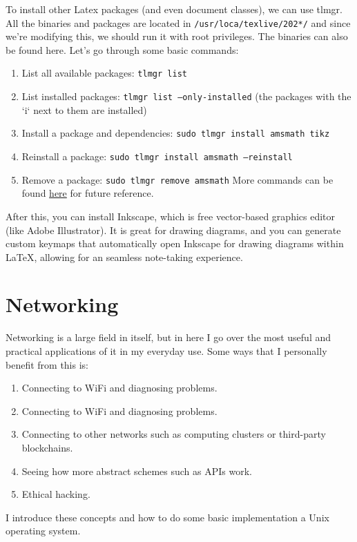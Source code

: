 \documentclass{article}
\begin{document}
To install other Latex packages (and even document classes), we can use tlmgr. All the binaries and packages are located in \texttt{/usr/loca/texlive/202*/} and since we're modifying this, we should run it with root privileges. The binaries can also be found here. Let's go through some basic commands: 
\begin{enumerate}
  \item List all available packages: \texttt{tlmgr list}
  \item List installed packages: \texttt{tlmgr list --only-installed} (the packages with the `i` next to them are installed)
  \item Install a package and dependencies: \texttt{sudo tlmgr install amsmath tikz} 
  \item Reinstall a package: \texttt{sudo tlmgr install amsmath --reinstall}
  \item Remove a package: \texttt{sudo tlmgr remove amsmath} 
More commands can be found \href{http://tug.ctan.org/info/tlmgrbasics/doc/tlmgr.pdf}{here} for future reference.  
\end{enumerate}

After this, you can install Inkscape, which is free vector-based graphics editor (like Adobe Illustrator). It is great for drawing diagrams, and you can generate custom keymaps that automatically open Inkscape for drawing diagrams within LaTeX, allowing for an seamless note-taking experience.  
  

\section{Networking}

  Networking is a large field in itself, but in here I go over the most useful and practical applications of it in my everyday use. Some ways that I personally benefit from this is:

  \begin{enumerate}
    \item Connecting to WiFi and diagnosing problems.  
    \item Connecting to WiFi and diagnosing problems. 
    \item Connecting to other networks such as computing clusters or third-party blockchains.  
    \item Seeing how more abstract schemes such as APIs work. 
    \item Ethical hacking. 
  \end{enumerate}
  I introduce these concepts and how to do some basic implementation a Unix operating system.
\end{document}
